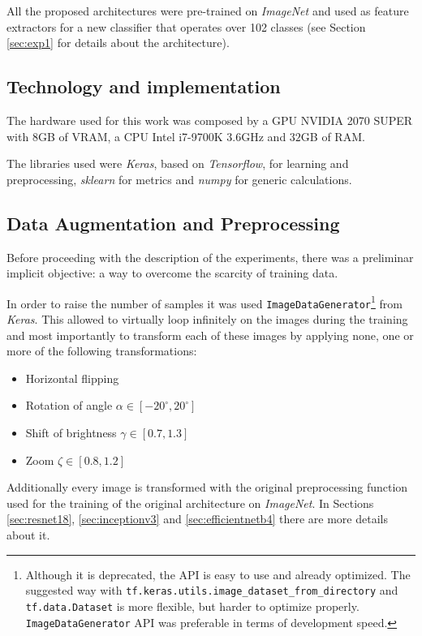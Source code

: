 All the proposed architectures were pre-trained on \textit{ImageNet}\cite{5206848} and used as feature extractors for a new classifier that operates over 102 classes (see Section \ref{sec:exp1} for details about the architecture).

\subsection{Technology and implementation}\label{sec:tech}
The hardware used for this work was composed by a GPU NVIDIA 2070 SUPER with 8GB of VRAM, a CPU Intel i7-9700K $3.6$GHz and $32$GB of RAM. \par
The libraries used were \textit{Keras}, based on \textit{Tensorflow}, for learning and preprocessing, \textit{sklearn} for metrics and \textit{numpy}  for generic calculations.


\subsection{Data Augmentation and Preprocessing}
Before proceeding with the description of the experiments, there was a preliminar implicit objective: a way to overcome the scarcity of training data.\par
In order to raise the number of samples it was used \texttt{ImageDataGenerator}\footnote{Although it is deprecated, the API is easy to use and already optimized. The suggested way with \texttt{tf.keras.utils.image\_dataset\_from\_directory} and \texttt{tf.data.Dataset} is more flexible, but harder to optimize properly. \texttt{ImageDataGenerator} API was preferable in terms of development speed.} from \textit{Keras}. This allowed to virtually loop infinitely on the images during the training and most importantly to transform each of these images by applying none, one or more of the following transformations:
\begin{itemize}
\item{Horizontal flipping}
\item{Rotation of angle $\alpha \in [-20^{\circ}, 20^{\circ}]$}
\item{Shift of brightness $\gamma \in [0.7, 1.3]$}
\item{Zoom  $\zeta \in [0.8, 1.2]$}
\end{itemize}
Additionally every image is transformed with the original preprocessing function used for the training of the original architecture on \textit{ImageNet}. In Sections \ref{sec:resnet18}, \ref{sec:inceptionv3} and \ref{sec:efficientnetb4} there are more details about it.


